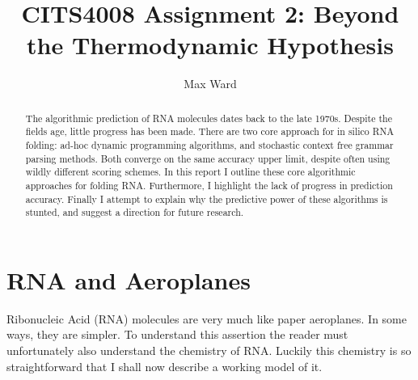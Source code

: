 \documentclass[12pt, a4paper]{article}
\title{CITS4008 Assignment 2: Beyond the Thermodynamic Hypothesis}
\author{Max Ward}
\begin{document}
\maketitle

\begin{abstract}
The algorithmic prediction of RNA molecules dates back to the late 1970s. Despite the fields age, little progress has been made. There are two core approach for in silico RNA folding: ad-hoc dynamic programming algorithms, and stochastic context free grammar parsing methods. Both converge on the same accuracy upper limit, despite often using wildly different scoring schemes. In this report I outline these core algorithmic approaches for folding RNA. Furthermore, I highlight the lack of progress in prediction accuracy. Finally I attempt to explain why the predictive power of these algorithms is stunted, and suggest a direction for future research.
\end{abstract}

\clearpage

\tableofcontents
\listoffigures
\clearpage

\section{RNA and Aeroplanes} 
Ribonucleic Acid (RNA) molecules are very much like paper aeroplanes. In some ways, they are simpler. To understand this assertion the reader must unfortunately also understand the chemistry of RNA. Luckily this chemistry is so straightforward that I shall now describe a working model of it.
\end{document}

